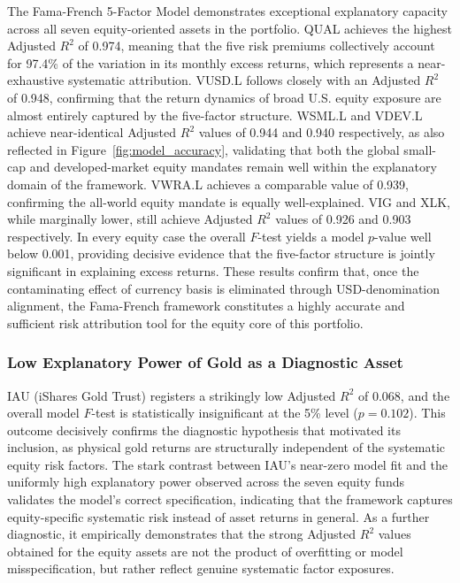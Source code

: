 \documentclass[12pt]{article}
\begin{document}
The Fama-French 5-Factor Model demonstrates exceptional explanatory capacity across all seven equity-oriented assets in the portfolio. QUAL achieves the highest Adjusted $R^2$ of 0.974, meaning that the five risk premiums collectively account for 97.4\% of the variation in its monthly excess returns, which represents a near-exhaustive systematic attribution. VUSD.L follows closely with an Adjusted $R^2$ of 0.948, confirming that the return dynamics of broad U.S. equity exposure are almost entirely captured by the five-factor structure. WSML.L and VDEV.L achieve near-identical Adjusted $R^2$ values of 0.944 and 0.940 respectively, as also reflected in Figure~\ref{fig:model_accuracy}, validating that both the global small-cap and developed-market equity mandates remain well within the explanatory domain of the framework. VWRA.L achieves a comparable value of 0.939, confirming the all-world equity mandate is equally well-explained. VIG and XLK, while marginally lower, still achieve Adjusted $R^2$ values of 0.926 and 0.903 respectively. In every equity case the overall $F$-test yields a model $p$-value well below 0.001, providing decisive evidence that the five-factor structure is jointly significant in explaining excess returns. These results confirm that, once the contaminating effect of currency basis is eliminated through USD-denomination alignment, the Fama-French framework constitutes a highly accurate and sufficient risk attribution tool for the equity core of this portfolio.

\subsubsection{Low Explanatory Power of Gold as a Diagnostic Asset}

IAU (iShares Gold Trust) registers a strikingly low Adjusted $R^2$ of 0.068, and the overall model $F$-test is statistically insignificant at the 5\% level ($p = 0.102$). This outcome decisively confirms the diagnostic hypothesis that motivated its inclusion, as physical gold returns are structurally independent of the systematic equity risk factors. The stark contrast between IAU's near-zero model fit and the uniformly high explanatory power observed across the seven equity funds validates the model's correct specification, indicating that the framework captures equity-specific systematic risk instead of asset returns in general. As a further diagnostic, it empirically demonstrates that the strong Adjusted $R^2$ values obtained for the equity assets are not the product of overfitting or model misspecification, but rather reflect genuine systematic factor exposures.
\end{document}
